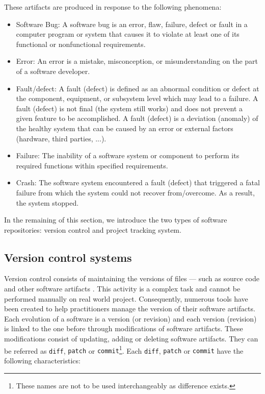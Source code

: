 These artifacts are produced in response to the following phenomena:

\begin{itemize}
	\item Software Bug: A software bug is an error, flaw, failure, defect or fault in a computer program or system that causes it to violate at least one of its functional or nonfunctional requirements.
	\item Error: An error is a mistake, misconception, or misunderstanding on the part of a software developer.
	\item Fault/defect: A fault (defect) is defined as an abnormal condition or defect at the component, equipment, or subsystem level which may lead to a failure. A fault (defect) is not final (the system still works) and does not prevent a given feature to be accomplished.  A fault (defect) is a deviation (anomaly) of the healthy system that can be caused by an error or external factors (hardware, third parties, ...).
	\item Failure: The inability of a software system or component to perform its required functions within specified requirements.
	\item Crash: The software system encountered a fault (defect) that triggered a fatal failure from which the system could not recover from/overcome. As a result,  the system stopped.
\end{itemize}

In the remaining of this section, we introduce the two types of software repositories: version control and project tracking system.

\subsection{Version control systems\label{sec:version-control}}

Version control consists of maintaining the versions of files --- such as source code and other software artifacts \cite{Zeller1997}.
This activity is a complex task and cannot be performed manually on real world project.
Consequently, numerous tools have been created to help practitioners manage the version of their software artifacts.
Each evolution of a software is a version (or revision) and each version (revision) is linked to the one before through modifications of software artifacts.
These modifications consist of updating, adding or deleting software artifacts.
They can be referred as \texttt{diff}, {\tt patch} or {\tt commit}\footnote{These names are not to be used interchangeably as difference exists.}.
Each \texttt{diff}, {\tt patch} or {\tt commit} have the following characteristics:

